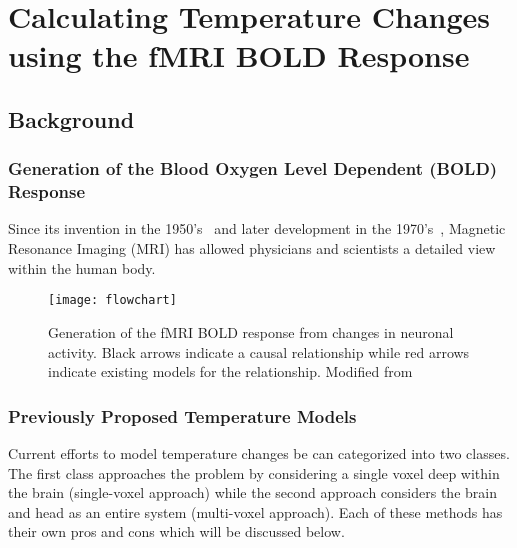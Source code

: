 \chapter{Calculating Temperature Changes using the fMRI BOLD Response}

\section{Background}
  \subsection{Generation of the {B}lood {O}xygen {L}evel {D}ependent ({BOLD}) Response}
  
  Since its invention in the 1950's~\citep{carr1954} and later development in the 1970's~\citep{lauterbur1973}, {M}agnetic {R}esonance {I}maging ({MRI}) has allowed physicians and scientists a detailed view within the human body.  
    \begin{figure}[bt]
      \begin{center}
        \texttt{[image: flowchart]}
        \caption[Generation of the fMRI BOLD Response]{\label{fig:flowchart} Generation of the fMRI BOLD response from changes in neuronal activity.  Black arrows indicate a causal relationship while red arrows indicate existing models for the relationship.  Modified from~\citet{sotero2007}}
      \end{center}
    \end{figure}
    
  \subsection{Previously Proposed Temperature Models}
  Current efforts to model temperature changes be can categorized into two classes.  The first class approaches the problem by considering a single voxel deep within the brain (single-voxel approach) while the second approach considers the brain and head as an entire system (multi-voxel approach).  Each of these methods has their own pros and cons which will be discussed below.
